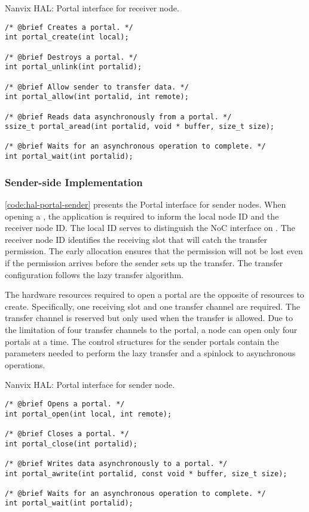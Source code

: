 \begin{listing}[!b]
\caption{Nanvix HAL: Portal interface for receiver node.}
\label{code:hal-portal-receiver}
\begin{verbatim}
/* @brief Creates a portal. */
int portal_create(int local);

/* @brief Destroys a portal. */
int portal_unlink(int portalid);

/* @brief Allow sender to transfer data. */
int portal_allow(int portalid, int remote);

/* @brief Reads data asynchronously from a portal. */
ssize_t portal_aread(int portalid, void * buffer, size_t size);

/* @brief Waits for an asynchronous operation to complete. */
int portal_wait(int portalid);
\end{verbatim}
\end{listing}

			\subsubsection{Sender-side Implementation}

				\autoref{code:hal-portal-sender} presents the Portal interface for
				sender nodes. When opening a \portal, the application is required to
				inform the local node ID and the receiver node ID. The local ID serves
				to distinguish the NoC interface on \ioclusters. The receiver node ID
				identifies the \cnoc receiving slot that will catch the transfer
				permission. The early allocation ensures that the permission will not
				be lost even if the permission arrives before the sender sets up the
				transfer. The transfer configuration follows the lazy transfer algorithm.

				The hardware resources required to open a portal are the opposite of
				resources to create. Specifically, one \cnoc receiving slot and one
				\dnoc transfer channel are required. The transfer channel is reserved
				but only used when the transfer is allowed. Due to the limitation of
				four transfer channels to the portal, a node can open only four portals
				at a time. The control structures for the sender portals contain the
				parameters needed to perform the lazy transfer and a spinlock to
				asynchronous operations.

\begin{listing}[!bh]
\caption{Nanvix HAL: Portal interface for sender node.}
\label{code:hal-portal-sender}
\begin{verbatim}
/* @brief Opens a portal. */
int portal_open(int local, int remote);

/* @brief Closes a portal. */
int portal_close(int portalid);

/* @brief Writes data asynchronously to a portal. */
int portal_awrite(int portalid, const void * buffer, size_t size);

/* @brief Waits for an asynchronous operation to complete. */
int portal_wait(int portalid);
\end{verbatim}
\end{listing}

